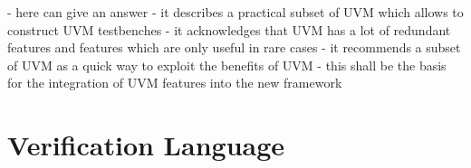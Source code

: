 - here \cite{sutherland2015uvm} can give an answer
- it describes a practical subset of UVM which allows to construct UVM testbenches
- it acknowledges that UVM has a lot of redundant features and features which are only useful in rare cases
- it recommends a subset of UVM as a quick way to exploit the benefits of UVM
- this shall be the basis for the integration of UVM features into the new framework

\section{Verification Language} %

